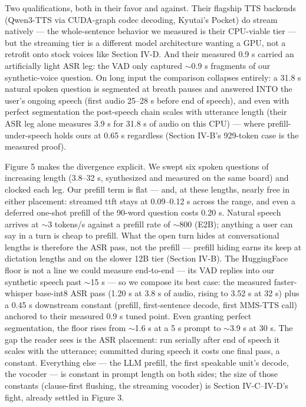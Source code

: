 \documentclass[journal]{IEEEtran}
\begin{document}
Two qualifications, both in their favor and against. Their flagship TTS backends (Qwen3-TTS via CUDA-graph codec decoding, Kyutai's Pocket) do stream natively — the whole-sentence behavior we measured is their CPU-viable tier — but the streaming tier is a different model architecture wanting a GPU, not a retrofit onto stock voices like Section IV-D. And their measured 0.9 s carried an artificially light ASR leg: the VAD only captured $\sim$0.9 s fragments of our synthetic-voice question. On long input the comparison collapses entirely: a 31.8 s natural spoken question is segmented at breath pauses and answered INTO the user's ongoing speech (first audio 25–28 s before end of speech), and even with perfect segmentation the post-speech chain scales with utterance length (their ASR leg alone measures 3.9 s for 31.8 s of audio on this CPU) — where prefill-under-speech holds ours at 0.65 s regardless (Section IV-B's 929-token case is the measured proof).

Figure 5 makes the divergence explicit. We swept six spoken questions of increasing length (3.8–32 s, synthesized and measured on the same board) and clocked each leg. Our prefill term is flat — and, at these lengths, nearly free in either placement: streamed ttft stays at 0.09–0.12 s across the range, and even a deferred one-shot prefill of the 90-word question costs 0.20 s. Natural speech arrives at $\sim$3 tokens/s against a prefill rate of $\sim$800 (E2B); anything a user can say in a turn is cheap to prefill. What the open turn hides at conversational lengths is therefore the ASR pass, not the prefill — prefill hiding earns its keep at dictation lengths and on the slower 12B tier (Section IV-B). The HuggingFace floor is not a line we could measure end-to-end — its VAD replies into our synthetic speech past $\sim$15 s — so we compose its best case: the measured faster-whisper base-int8 ASR pass (1.20 s at 3.8 s of audio, rising to 3.52 s at 32 s) plus a 0.45 s downstream constant (prefill, first-sentence decode, first MMS-TTS call) anchored to their measured 0.9 s tuned point. Even granting perfect segmentation, the floor rises from $\sim$1.6 s at a 5 s prompt to $\sim$3.9 s at 30 s. The gap the reader sees is the ASR placement: run serially after end of speech it scales with the utterance; committed during speech it costs one final pass, a constant. Everything else — the LLM prefill, the first speakable unit's decode, the vocoder — is constant in prompt length on both sides; the size of those constants (clause-first flushing, the streaming vocoder) is Section IV-C–IV-D's fight, already settled in Figure 3.
\end{document}
